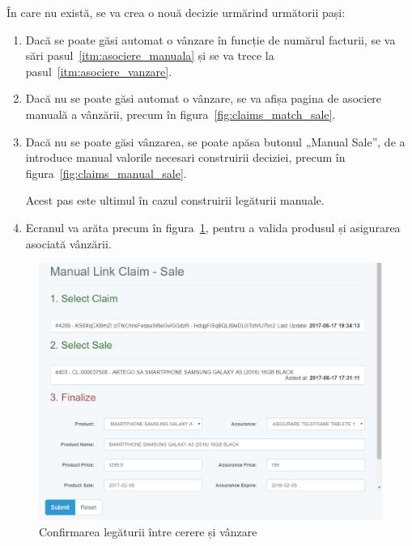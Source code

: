 		În care nu există, se va crea o nouă decizie urmărind următorii pași:
		\begin{enumerate}
			\item Dacă se poate găsi automat o vânzare în funcție de numărul facturii, se va sări pasul~\ref{itm:asociere_manuala} și se va trece la pasul~\ref{itm:asociere_vanzare}.
			\item
			Dacă nu se poate găsi automat o vânzare, se va afișa pagina de asociere manuală a vânzării, precum în figura~\ref{fig:claims_match_sale}.
			\label{itm:asociere_manuala}
			\item Dacă nu se poate găsi vânzarea, se poate apăsa butonul „Manual Sale”, de a introduce manual valorile necesari construirii deciziei, precum în figura~\ref{fig:claims_manual_sale}.

			Acest pas este ultimul în cazul construirii legăturii manuale.

			\item Ecranul va arăta precum în figura~\ref{fig:claims_match_confirm}, pentru a valida produsul și asigurarea asociată vânzării.
			\label{itm:asociere_vanzare}
		\end{enumerate}

	\begin{figure}
		\includegraphics[width=\linewidth]{../imagini/claims_match_confirm.png}
		\caption{Confirmarea legăturii între cerere și vânzare}
		\label{fig:claims_match_confirm}
	\end{figure}

